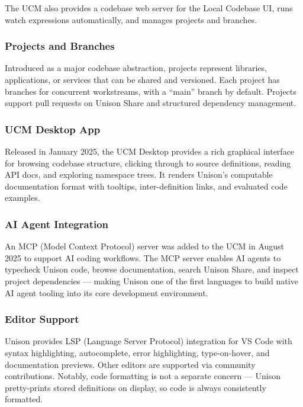 \documentclass[11pt,letterpaper]{article}
\begin{document}
The UCM also provides a codebase web server for the Local Codebase UI, runs watch expressions automatically, and manages projects and branches.

\subsubsection{Projects and Branches}

Introduced as a major codebase abstraction, projects represent libraries, applications, or services that can be shared and versioned. Each project has branches for concurrent workstreams, with a ``main'' branch by default. Projects support pull requests on Unison Share and structured dependency management.

\subsubsection{UCM Desktop App}

Released in January 2025, the UCM Desktop provides a rich graphical interface for browsing codebase structure, clicking through to source definitions, reading API docs, and exploring namespace trees. It renders Unison's computable documentation format with tooltips, inter-definition links, and evaluated code examples.

\subsubsection{AI Agent Integration}

An MCP (Model Context Protocol) server was added to the UCM in August 2025 to support AI coding workflows. The MCP server enables AI agents to typecheck Unison code, browse documentation, search Unison Share, and inspect project dependencies --- making Unison one of the first languages to build native AI agent tooling into its core development environment.

\subsubsection{Editor Support}

Unison provides LSP (Language Server Protocol) integration for VS Code with syntax highlighting, autocomplete, error highlighting, type-on-hover, and documentation previews. Other editors are supported via community contributions. Notably, code formatting is not a separate concern --- Unison pretty-prints stored definitions on display, so code is always consistently formatted.
\end{document}
